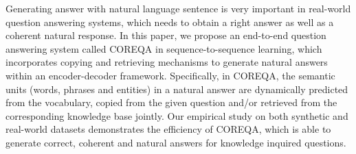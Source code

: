 Generating answer with natural language sentence is very important in real-world question answering systems, which needs to obtain a right answer as well as a coherent natural response. In this paper, we propose an end-to-end question answering system called COREQA in sequence-to-sequence learning, which incorporates copying and retrieving mechanisms to generate natural answers within an encoder-decoder framework. Specifically, in COREQA, the semantic units (words, phrases and entities) in a natural answer are dynamically predicted from the vocabulary, copied from the given question and/or retrieved from the corresponding knowledge base jointly. Our empirical study on both synthetic and real-world datasets demonstrates the efficiency of COREQA, which is able to generate correct, coherent and natural answers for knowledge inquired questions.
